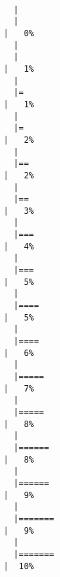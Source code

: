 \documentclass[
  letterpaper,
]{book}
\begin{document}
\begin{verbatim}

  |                                                                            
  |                                                                      |   0%
  |                                                                            
  |                                                                      |   1%
  |                                                                            
  |=                                                                     |   1%
  |                                                                            
  |=                                                                     |   2%
  |                                                                            
  |==                                                                    |   2%
  |                                                                            
  |==                                                                    |   3%
  |                                                                            
  |===                                                                   |   4%
  |                                                                            
  |===                                                                   |   5%
  |                                                                            
  |====                                                                  |   5%
  |                                                                            
  |====                                                                  |   6%
  |                                                                            
  |=====                                                                 |   7%
  |                                                                            
  |=====                                                                 |   8%
  |                                                                            
  |======                                                                |   8%
  |                                                                            
  |======                                                                |   9%
  |                                                                            
  |=======                                                               |   9%
  |                                                                            
  |=======                                                               |  10%

\end{verbatim}
\end{document}
